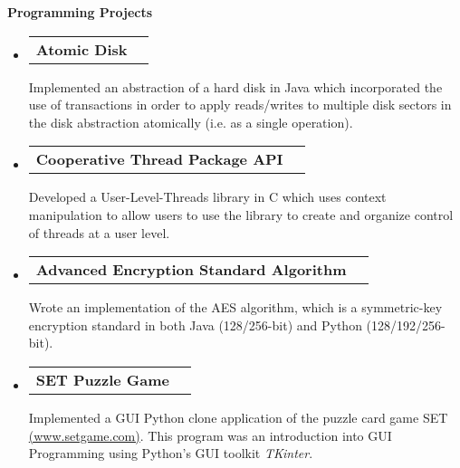 \documentclass[letterpaper,10pt]{article}
\makeatletter
\newcommand{\resheading}[1]{{\large \colorbox{mygrey}{\begin{minipage}{\textwidth}{\textbf{#1 \vphantom{p\^{E}}}}\end{minipage}}}}
\newcommand{\projectheading}[1]{
\begin{tabular*}{6.5in}{l@{\extracolsep{\fill}}r}
		\textbf{#1}
\end{tabular*}\vspace{6pt}}
\makeatother
\begin{document}
\resheading{Programming Projects}
	\begin{itemize}
		\item 
			\projectheading{Atomic Disk}
				{
				\begin{itemize}
					{Implemented an abstraction of a hard disk in Java which incorporated}
					{the use of transactions in order to apply reads/writes to multiple}
					{disk sectors in the disk abstraction atomically (i.e. as a single operation).}
				\end{itemize}
				}
		\item
			\projectheading{Cooperative Thread Package API}
				{
				\begin{itemize}
					{Developed a User-Level-Threads library in C which uses context manipulation}
					{to allow users to use the library to create and organize control of threads at a user level.}
				\end{itemize}
        			}
\begin{comment}
        	\item
			\projectheading{Proportional-Share Network Scheduler}
				{
				\begin{itemize}
					{Wrote methods for a network scheduler program in C++. Although}
					{not many lines of code were written, the goal of the project was to acquire}
					{experience in writing and debugging multithreaded code, as well as}
					{learning to correctly use synchronization data types such as monitors.}
				\end{itemize}
				}
\end{comment}
		\item 
			\projectheading{Advanced Encryption Standard Algorithm}
				{
				\begin{itemize}
					{Wrote an implementation of the AES algorithm, which is a symmetric-key encryption}
					{standard in both Java (128/256-bit) and Python (128/192/256-bit).}
				\end{itemize}
				}
\begin{comment}
		\item			
			\projectheading{L1 Cache Simulator}
				{
				\begin{itemize}
					{Programmed a Level 1 cache simulator in Java. This project was designed to give an understanding on how}
					{caching hardware work with respect to memory. The cache simulator's funtionally represents the functions}
					{of actual cache hardware, such as write backs, write allocations, and the LRU replacement algorithm.}
				\end{itemize}
				}
\end{comment}
		\item
			\projectheading{SET Puzzle Game}
				{
				\begin{itemize}
					{Implemented a GUI Python clone application of the puzzle card game SET \href{http://www.setgame.com}{(www.setgame.com)}.}
					{This program was an introduction into GUI Programming using Python's GUI toolkit}
					{\textit{TKinter}.}
				\end{itemize}
				}
	\end{itemize}  %
\end{document}
